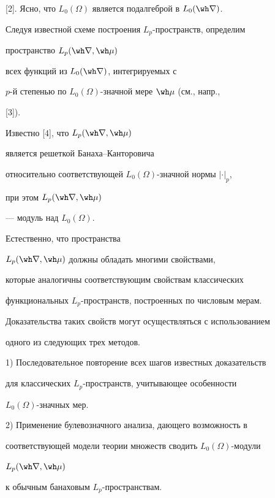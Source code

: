 [2]. Ясно, что $L_0(\Omega)$ является подалгеброй в $L_0(\wh\nabla)$. 


 


Следуя известной схеме построения $L_p$-пространств, определим 


пространство $L_p(\wh\nabla,\wh\mu)$ 


всех функций из $L_0(\wh\nabla)$, интегрируемых с 


$p$-й степенью по $L_0(\Omega)$-значной мере $\wh\mu$ (см., напр., 


[3]). 


 


Известно [4], что $L_p(\wh\nabla,\wh\mu)$ 


является решеткой Банаха--Канторовича 


относительно соответствующей $L_0(\Omega)$-значной нормы $|\cdot|_p$, 


при этом $L_p(\wh\nabla,\wh\mu)$ 


--- модуль над $L_0(\Omega)$. 


 


Естественно, что пространства 


$L_p(\wh\nabla,\wh\mu)$ должны обладать многими свойствами, 


которые аналогичны соответствующим свойствам классических 


функциональных $L_p$-пространств, построенных по числовым мерам. 


Доказательства таких свойств могут осуществляться с использованием 


одного из следующих трех методов. 


 


1) Последовательное повторение всех шагов известных доказательств 


для классических $L_p$-пространств, учитывающее особенности 


$L_0(\Omega)$-значных мер. 


 


2) Применение булевозначного анализа, дающего возможность в 


соответствующей модели теории множеств сводить $L_0(\Omega)$-модули 


$L_p(\wh\nabla,\wh\mu)$ 


к обычным банаховым $L_p$-пространствам. 


